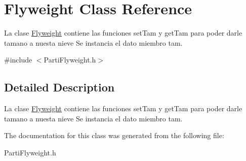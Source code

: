 \hypertarget{classFlyweight}{}\section{Flyweight Class Reference}
\label{classFlyweight}


La clase \hyperlink{classFlyweight}{Flyweight} contiene las funciones set\+Tam y get\+Tam para poder darle tamano a nuesta nieve  Se instancia el dato miembro tam.  




{\ttfamily \#include $<$Parti\+Flyweight.\+h$>$}



\subsection{Detailed Description}
La clase \hyperlink{classFlyweight}{Flyweight} contiene las funciones set\+Tam y get\+Tam para poder darle tamano a nuesta nieve  Se instancia el dato miembro tam. 

The documentation for this class was generated from the following file\+:\begin{DoxyCompactItemize}
\item 
Parti\+Flyweight.\+h\end{DoxyCompactItemize}
